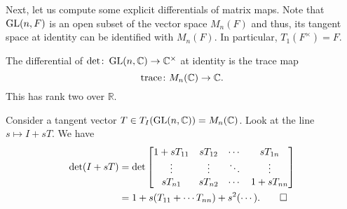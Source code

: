 \documentclass[12pt]{article}
\begin{document}
Next, let us compute some explicit differentials of matrix maps. Note that $\operatorname{GL}(n, F)$ is an open subset of the vector space $M_{n}(F)$ and thus, its tangent space at identity can be identified with $M_{n}(F)$. \newline
In particular, $T_{1}(F^{\times}) = F$.

\begin{thm} \label{thm:diff-complex-det-is-trace}
	The differential of $\det \colon \operatorname{GL}(n, \mathbb{C}) \to \mathbb{C}^{\times}$ at identity is the trace map
	\begin{equation*} 
		\operatorname{trace} \colon M_{n}(\mathbb{C}) \to \mathbb{C}.
	\end{equation*}
	This has rank two over $\mathbb{R}$.
\end{thm}
\begin{sketch}
	Consider a tangent vector $T \in T_{I}(\operatorname{GL}(n, \mathbb{C})) = M_{n}(\mathbb{C})$. 
	Look at the line $s \mapsto I + sT$. 
	We have
	\begin{align*} 
		\det(I + sT) &
		= \det
		\begin{bmatrix}
			1 + s T_{11} & s T_{12} & \cdots & s T_{1n} \\
			\vdots & \vdots & \ddots & \vdots \\
			s T_{n1} & s T_{n2} & \cdots & 1 + s T_{nn} \\
		\end{bmatrix} \\
		&= 1 + s(T_{11} + \cdots T_{nn}) + s^{2}(\cdots). \qedhere
	\end{align*}
\end{sketch}
\end{document}

